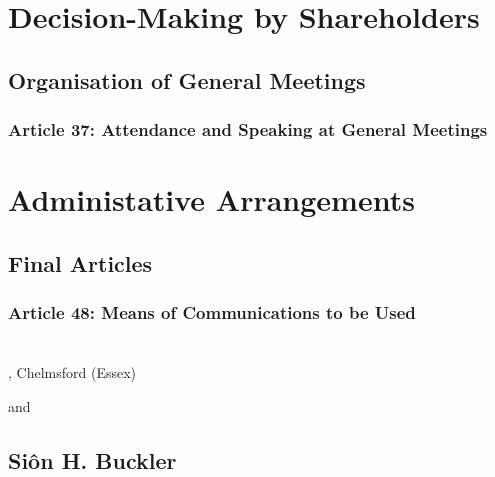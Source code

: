 \documentclass[letterpaper,10pt,openany,oneside,english]{sphinxmanual}
\begin{document}
\chapter{Decision-Making by Shareholders}
\label{\detokenize{decisionmaking:decision-making-by-shareholders}}\label{\detokenize{decisionmaking::doc}}

\section{Organisation of General Meetings}
\label{\detokenize{decisionmaking:organisation-of-general-meetings}}

\subsection{Article 37: Attendance and Speaking at General Meetings}
\label{\detokenize{decisionmaking:article-37-attendance-and-speaking-at-general-meetings}}

\chapter{Administative Arrangements}
\label{\detokenize{administrativearrangements:administative-arrangements}}\label{\detokenize{administrativearrangements::doc}}

\section{Final Articles}
\label{\detokenize{administrativearrangements:final-articles}}

\subsection{Article 48: Means of Communications to be Used}
\label{\detokenize{administrativearrangements:article-48-means-of-communications-to-be-used}}

\chapter{}
\label{\detokenize{index:document-author-s}}
, Chelmsford (Essex)

and


\section{Siôn H. Buckler}
\label{\detokenize{index:sion-h-buckler}}
\end{document}
